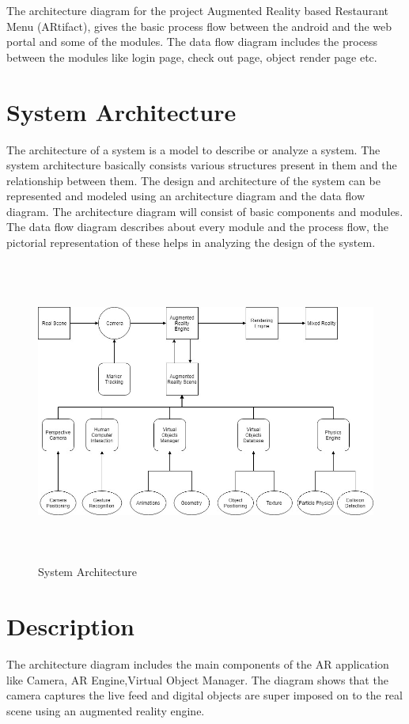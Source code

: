 \documentclass[BTech]{srmuthesis}
\begin{document}
The architecture diagram for the project Augmented Reality based Restaurant Menu (ARtifact), gives the basic process flow between the android and the web portal and some of the modules. The data flow diagram includes the process between the modules like login page, check out page, object render page etc.
\section{System Architecture}
The architecture of a system is a model to describe or analyze a system. The system architecture basically consists various structures present in them and the relationship between them. The design and architecture of the system can be represented and modeled using an architecture diagram and the data flow diagram. The architecture diagram will consist of  basic components and modules. The data flow diagram describes about every module and the process flow, the pictorial representation of these helps in analyzing the design of the system.
\begin{figure}[htbp]
	\centering
	\includegraphics[width=\linewidth, height=10cm,keepaspectratio]{arch}
	\caption{System Architecture}
	\label{fig:arch}
\end{figure}

\section{Description}
The architecture diagram includes the main components of the AR application like Camera, AR Engine,Virtual Object Manager. The diagram shows that the camera captures the live feed and digital objects are super imposed on to the real scene using an augmented reality engine.
\end{document}

